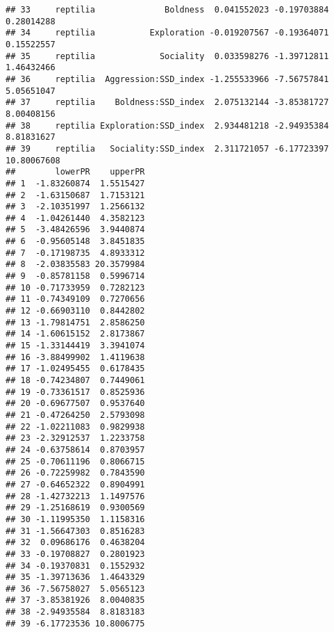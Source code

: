 \documentclass[]{article}
\newenvironment{Shaded}{\begin{snugshade}}{\end{snugshade}}
\newcommand{\KeywordTok}[1]{\textcolor[rgb]{0.13,0.29,0.53}{\textbf{#1}}}
\newcommand{\DataTypeTok}[1]{\textcolor[rgb]{0.13,0.29,0.53}{#1}}
\newcommand{\StringTok}[1]{\textcolor[rgb]{0.31,0.60,0.02}{#1}}
\newcommand{\CommentTok}[1]{\textcolor[rgb]{0.56,0.35,0.01}{\textit{#1}}}
\newcommand{\OperatorTok}[1]{\textcolor[rgb]{0.81,0.36,0.00}{\textbf{#1}}}
\newcommand{\NormalTok}[1]{#1}
\begin{document}
\begin{verbatim}
## 33     reptilia              Boldness  0.041552023 -0.19703884  0.28014288
## 34     reptilia           Exploration -0.019207567 -0.19364071  0.15522557
## 35     reptilia             Sociality  0.033598276 -1.39712811  1.46432466
## 36     reptilia  Aggression:SSD_index -1.255533966 -7.56757841  5.05651047
## 37     reptilia    Boldness:SSD_index  2.075132144 -3.85381727  8.00408156
## 38     reptilia Exploration:SSD_index  2.934481218 -2.94935384  8.81831627
## 39     reptilia   Sociality:SSD_index  2.311721057 -6.17723397 10.80067608
##        lowerPR    upperPR
## 1  -1.83260874  1.5515427
## 2  -1.63150687  1.7153121
## 3  -2.10351997  1.2566132
## 4  -1.04261440  4.3582123
## 5  -3.48426596  3.9440874
## 6  -0.95605148  3.8451835
## 7  -0.17198735  4.8933312
## 8  -2.03835583 20.3579984
## 9  -0.85781158  0.5996714
## 10 -0.71733959  0.7282123
## 11 -0.74349109  0.7270656
## 12 -0.66903110  0.8442802
## 13 -1.79814751  2.8586250
## 14 -1.60615152  2.8173867
## 15 -1.33144419  3.3941074
## 16 -3.88499902  1.4119638
## 17 -1.02495455  0.6178435
## 18 -0.74234807  0.7449061
## 19 -0.73361517  0.8525936
## 20 -0.69677507  0.9537640
## 21 -0.47264250  2.5793098
## 22 -1.02211083  0.9829938
## 23 -2.32912537  1.2233758
## 24 -0.63758614  0.8703957
## 25 -0.70611196  0.8066715
## 26 -0.72259982  0.7843590
## 27 -0.64652322  0.8904991
## 28 -1.42732213  1.1497576
## 29 -1.25168619  0.9300569
## 30 -1.11995350  1.1158316
## 31 -1.56647303  0.8516283
## 32  0.09686176  0.4638204
## 33 -0.19708827  0.2801923
## 34 -0.19370831  0.1552932
## 35 -1.39713636  1.4643329
## 36 -7.56758027  5.0565123
## 37 -3.85381926  8.0040835
## 38 -2.94935584  8.8183183
## 39 -6.17723536 10.8006775
\end{verbatim}

\begin{Shaded}
\end{Shaded}
\end{document}

